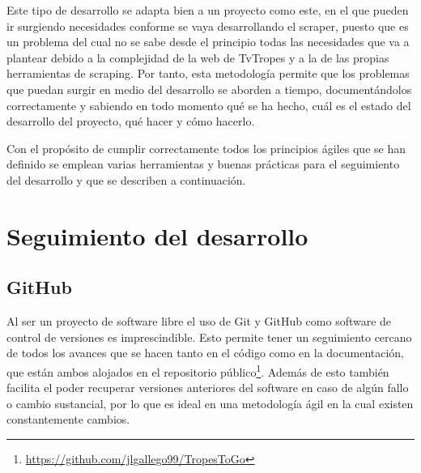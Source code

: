 Este tipo de desarrollo se adapta bien a un proyecto como este, en el que pueden
ir surgiendo necesidades conforme se vaya desarrollando el scraper, puesto que
es un problema del cual no se sabe desde el principio todas las necesidades que
va a plantear debido a la complejidad de la web de TvTropes y a la de las
propias herramientas de scraping. Por tanto, esta metodología permite que los
problemas que puedan surgir en medio del desarrollo se aborden a tiempo,
documentándolos correctamente y sabiendo en todo momento qué se ha hecho, cuál
es el estado del desarrollo del proyecto, qué hacer y cómo hacerlo.

Con el propósito de cumplir correctamente todos los principios ágiles que se han
definido se emplean varias herramientas y buenas prácticas para el seguimiento
del desarrollo y que se describen a continuación.

\section{Seguimiento del desarrollo}
\subsection{GitHub}
Al ser un proyecto de software libre el uso de Git y GitHub como software de
control de versiones es imprescindible. Esto permite tener un seguimiento
cercano de todos los avances que se hacen tanto en el código como en la
documentación, que están ambos alojados en el repositorio
público\footnote{\url{https://github.com/jlgallego99/TropesToGo}}. Además de
esto también facilita el poder recuperar versiones anteriores del software en
caso de algún fallo o cambio sustancial, por lo que es ideal en una metodología
ágil en la cual existen constantemente cambios.

